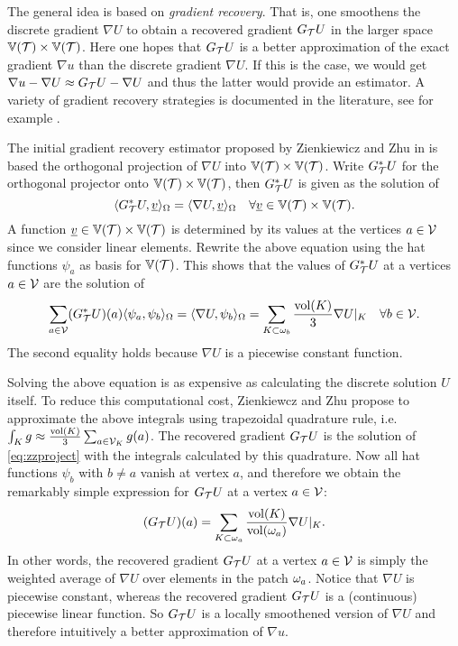 \documentclass[thesis.tex]{subfiles}
\begin{document}
The general idea is based on \emph{gradient recovery}. That is, one smoothens the discrete gradient $\nabla U$ to obtain a
recovered gradient $G_{\mathcal{T}} U$ in the larger space $\mathbb{V}(\mathcal{T}) \times \mathbb{V}(\mathcal{T})$. Here
one hopes that $G_{\mathcal{T}} U$ is a better approximation of the exact gradient $\nabla u$ than the discrete gradient $\nabla U$.
If this is the case, we would get $\nabla u - \nabla U \approx G_{\mathcal{T}} U - \nabla U$ and thus the latter would provide
an estimator.  A variety of gradient recovery strategies is documented in the literature, see for example \cite{zienkiewicz1992superconvergent}. 

The initial gradient recovery estimator proposed by Zienkiewicz and Zhu in \cite{zienkiewicz1987simple} is based
the orthogonal projection of $\nabla U$ into $\mathbb{V}(\mathcal{T}) \times \mathbb{V}(\mathcal{T})$. Write $G_{\mathcal{T}}^*U$ for the orthogonal
projector onto $\mathbb{V}(\mathcal{T}) \times \mathbb{V}(\mathcal{T})$, then $G_{\mathcal{T}}^*U$ is given as the solution of
\[
  \langle G_{\mathcal{T}}^*U, \underline{v}  \rangle_\Omega = \langle \nabla U,\underline{v} \rangle_\Omega \quad \forall \underline{v} \in \mathbb{V}(\mathcal{T}) \times \mathbb{V}(\mathcal{T}).
\]
A function $\underline{v} \in \mathbb{V}(\mathcal{T}) \times \mathbb{V}(\mathcal{T})$ is determined by its values at the vertices $a \in \mathcal{V}$
since we consider linear elements. Rewrite the above equation using the hat functions $\psi_a$ as basis for $\mathbb{V}(\mathcal{T})$.
This shows that the values of $G_{\mathcal{T}}^*U$ at a vertices $a \in \mathcal{V}$ are the solution of 
\begin{equation}
  \label{eq:zzproject}
  \sum_{a \in \mathcal{V}} (G_{\mathcal{T}}^* U)(a) \langle \psi_a, \psi_b \rangle_\Omega = \langle \nabla U, \psi_b \rangle_{\Omega} = \sum_{K \subset \omega_b} \frac{\operatorname{vol}(K)}{3} \nabla U|_K \quad \forall b \in \mathcal{V}.
\end{equation}
The second equality holds because $\nabla U$ is a piecewise constant function.

Solving the above equation is as expensive as calculating the discrete solution $U$ itself. To
reduce this computational cost, Zienkiewcz and Zhu \cite{zienkiewicz1987simple} propose to approximate the
above integrals using trapezoidal quadrature rule, i.e. $\int_K g \approx \frac{\operatorname{vol}(K)}{3} \sum_{a \in \mathcal{V}_K} g(a)$. 
The recovered gradient $G_{\mathcal{T}} U$ is the solution of \eqref{eq:zzproject} with the integrals calculated by this quadrature.
Now all hat functions $\psi_b$ with $b\ne a$ vanish at vertex $a$, and therefore we obtain the remarkably simple expression
for $G_{\mathcal{T}} U$ at a vertex $a \in \mathcal{V}$:
\[
  (G_{\mathcal{T}} U)(a) = \sum_{K \subset \omega_a} \frac{\operatorname{vol}(K)}{\operatorname{vol}(\omega_a)} \nabla U|_K.
\]
In other words, the recovered gradient $G_{\mathcal{T}} U$ at a vertex $a \in \mathcal{V}$ is simply the weighted average of $\nabla U$ over
elements in the patch $\omega_a$. Notice that $\nabla U$ is piecewise constant, whereas
the recovered gradient $G_{\mathcal{T}} U$ is a (continuous) piecewise linear function. So $G_{\mathcal{T}} U$ is a
locally smoothened version of $\nabla U$ and therefore intuitively a better approximation of $\nabla u$. 
\end{document}
